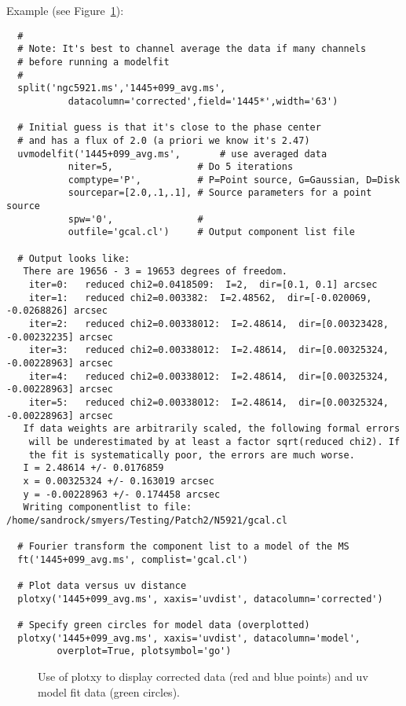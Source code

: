 {Example (see Figure~\ref{fig:modelfit}):
\small
\begin{verbatim}
  #
  # Note: It's best to channel average the data if many channels
  # before running a modelfit
  #
  split('ngc5921.ms','1445+099_avg.ms',
           datacolumn='corrected',field='1445*',width='63')

  # Initial guess is that it's close to the phase center
  # and has a flux of 2.0 (a priori we know it's 2.47)
  uvmodelfit('1445+099_avg.ms',       # use averaged data
           niter=5,               # Do 5 iterations
           comptype='P',          # P=Point source, G=Gaussian, D=Disk
           sourcepar=[2.0,.1,.1], # Source parameters for a point source
           spw='0',               # 
           outfile='gcal.cl')     # Output component list file
  
  # Output looks like:
   There are 19656 - 3 = 19653 degrees of freedom.
    iter=0:   reduced chi2=0.0418509:  I=2,  dir=[0.1, 0.1] arcsec
    iter=1:   reduced chi2=0.003382:  I=2.48562,  dir=[-0.020069, -0.0268826] arcsec
    iter=2:   reduced chi2=0.00338012:  I=2.48614,  dir=[0.00323428, -0.00232235] arcsec
    iter=3:   reduced chi2=0.00338012:  I=2.48614,  dir=[0.00325324, -0.00228963] arcsec
    iter=4:   reduced chi2=0.00338012:  I=2.48614,  dir=[0.00325324, -0.00228963] arcsec
    iter=5:   reduced chi2=0.00338012:  I=2.48614,  dir=[0.00325324, -0.00228963] arcsec
   If data weights are arbitrarily scaled, the following formal errors
    will be underestimated by at least a factor sqrt(reduced chi2). If 
    the fit is systematically poor, the errors are much worse.
   I = 2.48614 +/- 0.0176859
   x = 0.00325324 +/- 0.163019 arcsec
   y = -0.00228963 +/- 0.174458 arcsec
   Writing componentlist to file: /home/sandrock/smyers/Testing/Patch2/N5921/gcal.cl

  # Fourier transform the component list to a model of the MS
  ft('1445+099_avg.ms', complist='gcal.cl')           

  # Plot data versus uv distance
  plotxy('1445+099_avg.ms', xaxis='uvdist', datacolumn='corrected')

  # Specify green circles for model data (overplotted)
  plotxy('1445+099_avg.ms', xaxis='uvdist', datacolumn='model',
         overplot=True, plotsymbol='go') 
\end{verbatim}
\normalsize

\begin{figure}[h!]
\begin{center}
\caption{\label{fig:modelfit} Use of plotxy to display corrected data
  (red and blue points) and uv model fit data (green circles).} 
\hrulefill
\end{center}
\end{figure}


}
